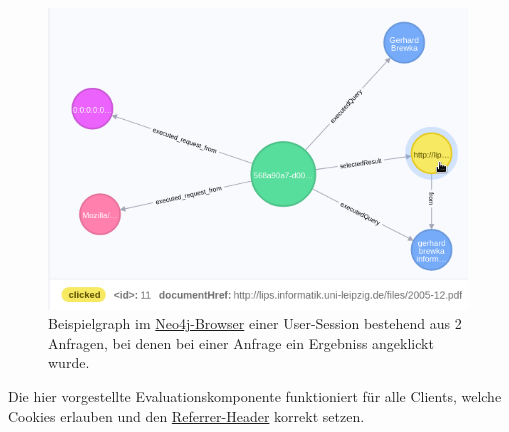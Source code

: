 \begin{figure}[!ht]
	\includegraphics[width=0.99\textwidth]{chapter_query_processing/example_neo4j_visualization.png}
	\caption{Beispielgraph im
	\href{https://neo4j.com/developer/guide-neo4j-browser/}{Neo4j-Browser}
	einer User-Session bestehend aus 2 Anfragen, bei denen bei einer Anfrage ein Ergebniss angeklickt wurde.}
	\label{fig:visualization}
\end{figure}

Die hier vorgestellte Evaluationskomponente funktioniert für alle Clients, welche Cookies erlauben und den \href{}{Referrer-Header}
korrekt setzen.
